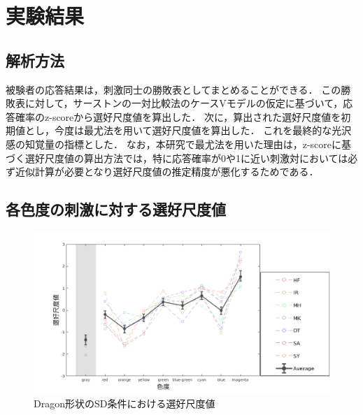     \section{実験結果}
        \subsection{解析方法}
            被験者の応答結果は，刺激同士の勝敗表としてまとめることができる．
            この勝敗表に対して，サーストンの一対比較法のケースVモデルの仮定に基づいて，応答確率のz-scoreから選好尺度値を算出した．
            次に，算出された選好尺度値を初期値とし，今度は最尤法を用いて選好尺度値を算出した．
            これを最終的な光沢感の知覚量の指標とした．
            なお，本研究で最尤法を用いた理由は，z-scoreに基づく選好尺度値の算出方法では，特に応答確率が0や1に近い刺激対においては必ず近似計算が必要となり選好尺度値の推定精度が悪化するためである．
            
        \newpage
        \subsection{各色度の刺激に対する選好尺度値}
            
            \begin{figure}[h]
                \centering
                \includegraphics[width=15.0cm]{./img/ex1_res_DSD_p.png}
                \caption{Dragon形状のSD条件における選好尺度値}
                \label{ex1_DSD}
            \end{figure}

